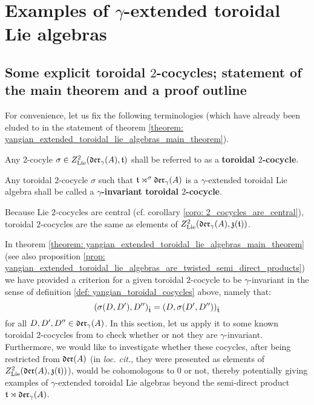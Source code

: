 \section{Examples of \texorpdfstring{$\gamma$}{}-extended toroidal Lie algebras}
    \subsection{Some explicit toroidal \texorpdfstring{$2$}{}-cocycles; statement of the main theorem and a proof outline}
        For convenience, let us fix the following terminologies (which have already been eluded to in the statement of theorem \ref{theorem: yangian_extended_toroidal_lie_algebras_main_theorem}).
        \begin{definition} \label{def: yangian_toroidal_cocycles}
            Any $2$-cocyle $\sigma \in Z^2_{\mathrm{Lie}}(\mathfrak{der}_{\gamma}(A), \mathfrak{t})$ shall be referred to as a \textbf{toroidal $2$-cocycle}.
            
            Any toroidal $2$-cocycle $\sigma$ such that $\mathfrak{t} \rtimes^{\sigma} \mathfrak{der}_{\gamma}(A)$ is a $\gamma$-extended toroidal Lie algebra shall be called a \textbf{$\gamma$-invariant toroidal $2$-cocycle}.
        \end{definition}
        \begin{remark}
            Because Lie $2$-cocycles are central (cf. corollary \ref{coro: 2_cocycles_are_central}), toroidal $2$-cocycles are the same as elements of $Z^2_{\mathrm{Lie}}( \mathfrak{der}_{\gamma}(A), \mathfrak{z}(\mathfrak{t}) )$.
        \end{remark}
        
        In theorem \ref{theorem: yangian_extended_toroidal_lie_algebras_main_theorem} (see also proposition \ref{prop: yangian_extended_toroidal_lie_algebras_are_twisted_semi_direct_products}) we have provided a criterion for a given toroidal $2$-cocycle to be $\gamma$-invariant in the sense of definition \ref{def: yangian_toroidal_cocycles} above, namely that:
            $$( \sigma(D, D'), D'' )_{\hat{\mathfrak{t}}} = ( D, \sigma(D', D'') )_{\hat{\mathfrak{t}}}$$
        for all $D, D', D'' \in \mathfrak{der}_{\gamma}(A)$. In this section, let us apply it to some known toroidal $2$-cocycles from \cite{billig_energy_momentum_tensor} to check whether or not they are $\gamma$-invariant. Furthermore, we would like to investigate whether these cocycles, after being restricted from $\mathfrak{der}(A)$ (in \textit{loc. cit.}, they were presented as elements of $Z^2_{\mathrm{Lie}}(\mathfrak{der}(A), \mathfrak{z}(\mathfrak{t}))$), would be cohomologous to $0$ or not, thereby potentially giving examples of $\gamma$-extended toroidal Lie algebras beyond the semi-direct product $\mathfrak{t} \rtimes \mathfrak{der}_{\gamma}(A)$.


